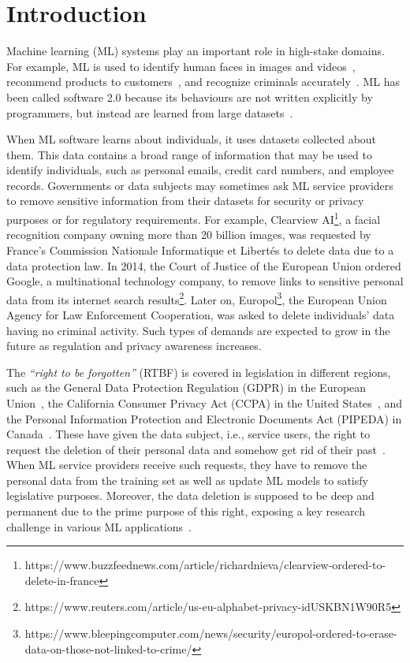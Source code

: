 

\section{Introduction}
\label{sec:intro}


Machine learning (ML) systems
play an important role in high-stake domains. For example, ML is used to identify human faces in images and videos~\cite{singhal2022survey}, recommend products to customers~\cite{li2011design}, and recognize criminals accurately~\cite{rudin2018optimized}. ML has been called software 2.0 because its behaviours are not written explicitly by programmers, but instead are learned from large datasets~\cite{ratner2019role}.

When ML software
learns about individuals, it uses
datasets collected about them. This data contains a broad range of information that may be used to identify individuals, such as personal emails, credit card numbers, and employee records. Governments or data
subjects may sometimes ask ML service providers to remove sensitive information from their datasets for security or privacy purposes or for regulatory requirements. For example, Clearview AI\footnote{https://www.buzzfeednews.com/article/richardnieva/clearview-ordered-to-delete-in-france}, a facial recognition company owning more than 20 billion images, was requested by France’s Commission Nationale Informatique et Libertés to delete data due to a data protection law. In 2014, the Court of Justice of the European Union ordered Google, a multinational technology company, to remove links to sensitive personal data from its internet search results\footnote{https://www.reuters.com/article/us-eu-alphabet-privacy-idUSKBN1W90R5}. Later on, Europol\footnote{https://www.bleepingcomputer.com/news/security/europol-ordered-to-erase-data-on-those-not-linked-to-crime/}, the European Union Agency for Law Enforcement Cooperation, was asked to delete individuals' data having no criminal activity. Such types of demands are expected to grow in the future as regulation and privacy awareness increases.

The \textit{``right to be forgotten''} (RTBF) is covered 
in legislation in different regions, such as the General Data Protection Regulation (GDPR) in the European Union~\cite{gdpr}, the California Consumer Privacy Act (CCPA) in the United States~\cite{ccpa}, and the Personal Information Protection and Electronic Documents Act (PIPEDA) in Canada~\cite{PIPEDA}. These have given the data subject, i.e., service users, the right to request the deletion of their personal data and somehow get rid of their past~\cite{rtbf}. When ML service providers
receive such requests, they have to remove the personal data from the training set as well as update ML models to satisfy legislative purposes. Moreover, the data deletion is supposed to be deep and permanent due to the prime purpose of this right, exposing a key research challenge in various ML
applications~\cite{responsible-data-management}. 

